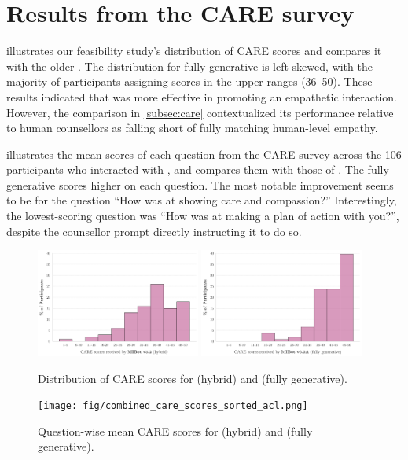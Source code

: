 \section{Results from the CARE survey}
\label{appendix:CAREdist}

 illustrates our feasibility study's distribution of CARE scores and compares it with the older \oldsysname \citep{brown2023mi}. The distribution for fully-generative \sysnamewithv is left-skewed, with the majority of participants assigning scores in the upper ranges (36–50). These results indicated that \sysname was more effective in promoting an empathetic interaction. However, the comparison in \cref{subsec:care} contextualized its performance relative to human counsellors as falling short of fully matching human-level empathy.

 illustrates the mean scores of each question from the CARE survey across the 106 participants who interacted with \sysnamewithv, and compares them with those of \oldsysname. The fully-generative \sysnamewithv scores higher on each question. The most notable improvement seems to be for the question “How was \sysname at showing care and compassion?”
Interestingly, the lowest-scoring question was “How was \sysname at making a plan of action with you?”, despite the counsellor prompt directly instructing it to do so.


\begin{figure}[H]
	\centering
	\includegraphics[width=0.48\textwidth]{fig/MIV5.2_care_scores_histogram.png} \hfill
	\includegraphics[width=0.48\textwidth]{fig/MIV6.3A_care_scores_histogram.png}
	\caption[Distribution of CARE scores for \oldsysname and \sysnamewithv]{Distribution of CARE scores for \oldsysname (hybrid) and \sysnamewithv (fully generative).}
	\label{fig:caredist}
\end{figure}



\vspace{-0.5cm}

\begin{figure}[!htbp]
	\centering
	\texttt{[image: fig/combined\_care\_scores\_sorted\_acl.png]}
	\caption[Question-wise mean CARE scores for \oldsysname and \sysnamewithv]{Question-wise mean CARE scores for \oldsysname (hybrid) and \sysnamewithv (fully generative).}
	\label{fig:caremean}
\end{figure}
